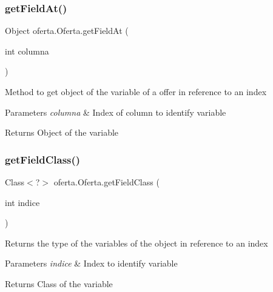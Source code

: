 \subsubsection{\texorpdfstring{get\+Field\+At()}{getFieldAt()}}
{\footnotesize\ttfamily Object oferta.\+Oferta.\+get\+Field\+At (\begin{DoxyParamCaption}\item[{int}]{columna }\end{DoxyParamCaption})\hspace{0.3cm}{\ttfamily [inline]}}

Method to get object of the variable of a offer in reference to an index


\begin{DoxyParams}{Parameters}
{\em columna} & Index of column to identify variable \\
\hline
\end{DoxyParams}
\begin{DoxyReturn}{Returns}
Object of the variable 
\end{DoxyReturn}
\mbox{\label{classoferta_1_1_oferta_ad86745793087dca9bce627f40db9e3db}} 
\subsubsection{\texorpdfstring{get\+Field\+Class()}{getFieldClass()}}
{\footnotesize\ttfamily Class$<$?$>$ oferta.\+Oferta.\+get\+Field\+Class (\begin{DoxyParamCaption}\item[{int}]{indice }\end{DoxyParamCaption})\hspace{0.3cm}{\ttfamily [inline]}}

Returns the type of the variables of the object in reference to an index


\begin{DoxyParams}{Parameters}
{\em indice} & Index to identify variable \\
\hline
\end{DoxyParams}
\begin{DoxyReturn}{Returns}
Class of the variable 
\end{DoxyReturn}
\mbox{\label{classoferta_1_1_oferta_aa069a89096c9621c3cc1b17b72b09d27}} 
